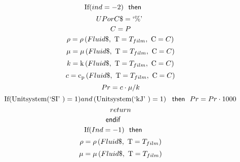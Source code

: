 \documentclass[10pt,fleqn]{article}
\newcommand{\F}[1]{\mbox{$#1$}}
\newcommand{\K}[1]{\mbox{\sf#1\ \ \mit}}
\newcommand{\KS}[1]{\mbox{\sf\ \ #1\ \ \mit}}
\newcommand{\SC}[1]{\mbox{`#1'}\  }
\newcommand{\V}[1]{\mbox{$ #1 $}}
\newcommand{\I}{\mbox{\hspace{0.20in}}}
\newcommand{\density}{\mathrm{\rho}}
\newcommand{\viscosity}{\mathrm{\mu}}
\newcommand{\conductivity}{\mathrm{k}}
\newcommand{\cp}{\mathrm{c_p}}
\begin{document}
\begin{equation}
\I \label{EES Eqn:26}
\mbox{If}{ \left( \V{ind} =-2 \right) } \KS{then} 
\end{equation}
\begin{equation}
\I \I \label{EES Eqn:27}
UPorC\$=\SC{\%} 
\end{equation}
\begin{equation}
\I \I \label{EES Eqn:28}
C=P 
\end{equation}
\begin{equation}
\I \I \label{EES Eqn:29}
\rho=\density \left(\F{Fluid}\$,\mbox{\ T}=T_{film},\mbox{\ C}=C \right)  
\end{equation}
\begin{equation}
\I \I \label{EES Eqn:30}
\mu=\viscosity \left(\F{Fluid}\$,\mbox{\ T}=T_{film},\mbox{\ C}=C \right)  
\end{equation}
\begin{equation}
\I \I \label{EES Eqn:31}
k=\conductivity \left(\F{Fluid}\$,\mbox{\ T}=T_{film},\mbox{\ C}=C \right)  
\end{equation}
\begin{equation}
\I \I \label{EES Eqn:32}
c=\cp \left(\F{Fluid}\$,\mbox{\ T}=T_{film},\mbox{\ C}=C \right)  
\end{equation}
\begin{equation}
\I \I \label{EES Eqn:33}
\V{Pr} =c\cdot \mu/k 
\end{equation}
\begin{equation}
\I \I \label{EES Eqn:34}
\mbox{If}{ \left( \mbox{Unitsystem}{ \left( \SC{SI} \right) }=1 \right) } \V{and}   \left( \mbox{Unitsystem}{ \left( \SC{kJ} \right) }=1 \right)  \KS{then} \V{Pr} =\V{Pr} \cdot 1000 
\end{equation}
\begin{equation}
\I \I \label{EES Eqn:35}
\V{return}  
\end{equation}
\begin{equation}
\I \label{EES Eqn:36}
\K{endif} 
\end{equation}
\begin{equation}
\I \label{EES Eqn:37}
\mbox{If}{ \left( \V{Ind} =-1 \right) } \KS{then} 
\end{equation}
\begin{equation}
\I \I \label{EES Eqn:38}
\rho=\rho\left( Fluid\$,\mbox{\ T}=T_{film} \right)  
\end{equation}
\begin{equation}
\I \I \label{EES Eqn:39}
\mu=\mu\left( Fluid\$,\mbox{\ T}=T_{film} \right)  
\end{equation}
\end{document}
